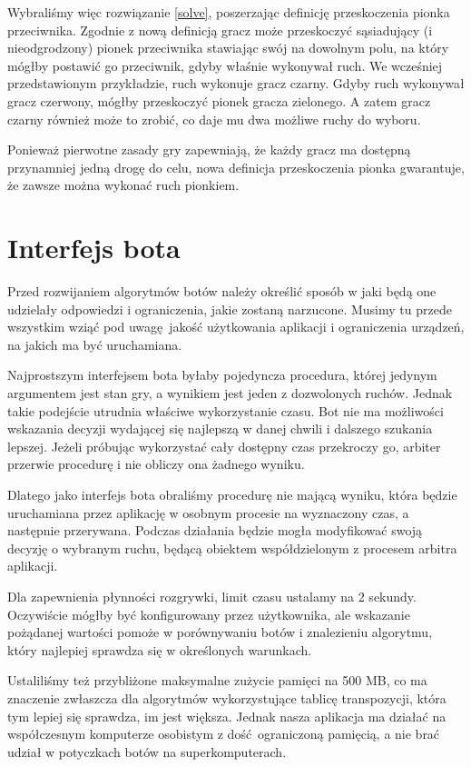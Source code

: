 \documentclass{pracamgr}
\begin{document}
Wybraliśmy więc rozwiązanie \ref{solve}, poszerzając definicję przeskoczenia pionka przeciwnika.
Zgodnie z nową definicją gracz może przeskoczyć sąsiadujący (i nieodgrodzony) pionek przeciwnika stawiając swój  na dowolnym polu, na który mógłby postawić go przeciwnik, gdyby właśnie wykonywał ruch.
We wcześniej przedstawionym przykładzie, ruch wykonuje gracz czarny.
Gdyby ruch wykonywał gracz czerwony, mógłby przeskoczyć pionek gracza zielonego.
A zatem gracz czarny również może to zrobić, co daje mu dwa możliwe ruchy do wyboru.

Ponieważ pierwotne zasady gry zapewniają, że każdy gracz ma dostępną przynamniej jedną drogę do celu, nowa definicja przeskoczenia pionka gwarantuje, że zawsze można wykonać ruch pionkiem.

\section{Interfejs bota}

Przed rozwijaniem algorytmów botów należy określić sposób w jaki będą one udzielały odpowiedzi i ograniczenia, jakie zostaną narzucone.
Musimy tu przede wszystkim wziąć pod uwagę jakość użytkowania aplikacji i ograniczenia urządzeń, na jakich ma być uruchamiana.

Najprostszym interfejsem bota byłaby pojedyncza procedura, której jedynym argumentem jest stan gry, a wynikiem jest jeden z dozwolonych ruchów.
Jednak takie podejście utrudnia właściwe wykorzystanie czasu.
Bot nie ma możliwości wskazania decyzji wydającej się najlepszą w danej chwili i dalszego szukania lepszej.
Jeżeli próbując wykorzystać cały dostępny czas przekroczy go, arbiter przerwie procedurę i nie obliczy ona żadnego wyniku.

Dlatego jako interfejs bota obraliśmy procedurę nie mającą wyniku, która będzie uruchamiana przez aplikację w osobnym procesie na wyznaczony czas, a następnie przerywana.
Podczas działania będzie mogła modyfikować swoją decyzję o wybranym ruchu, będącą obiektem współdzielonym z procesem arbitra aplikacji.

Dla zapewnienia płynności rozgrywki, limit czasu ustalamy na 2 sekundy.
Oczywiście mógłby być konfigurowany przez użytkownika, ale wskazanie pożądanej wartości pomoże w porównywaniu botów i znalezieniu algorytmu, który najlepiej sprawdza się w określonych warunkach.

Ustaliliśmy też przybliżone maksymalne zużycie pamięci na 500 MB, co ma znaczenie zwłaszcza dla algorytmów wykorzystujące tablicę transpozycji, która tym lepiej się sprawdza, im jest większa.
Jednak nasza aplikacja ma działać na współczesnym komputerze osobistym z dość ograniczoną pamięcią, a nie brać udział w potyczkach botów na superkomputerach.
\end{document}
